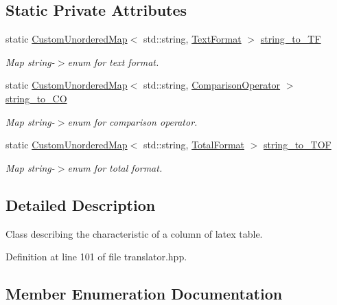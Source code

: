 \subsection*{Static Private Attributes}
\begin{DoxyCompactItemize}
\item 
static \hyperlink{custom__map_8hpp_ad1ed68f2ff093683ab1a33522b144adc}{Custom\+Unordered\+Map}$<$ std\+::string, \hyperlink{classTranslator_1_1LatexColumnFormat_a3e57341308ef433ca03cb41faa3e6c00}{Text\+Format} $>$ \hyperlink{classTranslator_1_1LatexColumnFormat_a36ea39931ecac504ff4df615c2aa4608}{string\+\_\+to\+\_\+\+TF}
\begin{DoxyCompactList}\small\item\em Map string-\/$>$enum for text format. \end{DoxyCompactList}\item 
static \hyperlink{custom__map_8hpp_ad1ed68f2ff093683ab1a33522b144adc}{Custom\+Unordered\+Map}$<$ std\+::string, \hyperlink{classTranslator_1_1LatexColumnFormat_a9401c4c02f92f224268e919aac9cb15e}{Comparison\+Operator} $>$ \hyperlink{classTranslator_1_1LatexColumnFormat_aba6d9359f0bb5746328261880506df22}{string\+\_\+to\+\_\+\+CO}
\begin{DoxyCompactList}\small\item\em Map string-\/$>$enum for comparison operator. \end{DoxyCompactList}\item 
static \hyperlink{custom__map_8hpp_ad1ed68f2ff093683ab1a33522b144adc}{Custom\+Unordered\+Map}$<$ std\+::string, \hyperlink{classTranslator_1_1LatexColumnFormat_a0754fb96fce28c9f04a8ef5353eede60}{Total\+Format} $>$ \hyperlink{classTranslator_1_1LatexColumnFormat_acf911d2311f5897a7e18498359c5cdfb}{string\+\_\+to\+\_\+\+T\+OF}
\begin{DoxyCompactList}\small\item\em Map string-\/$>$enum for total format. \end{DoxyCompactList}\end{DoxyCompactItemize}


\subsection{Detailed Description}
Class describing the characteristic of a column of latex table. 

Definition at line 101 of file translator.\+hpp.



\subsection{Member Enumeration Documentation}
\mbox{\label{classTranslator_1_1LatexColumnFormat_a9401c4c02f92f224268e919aac9cb15e}} 
